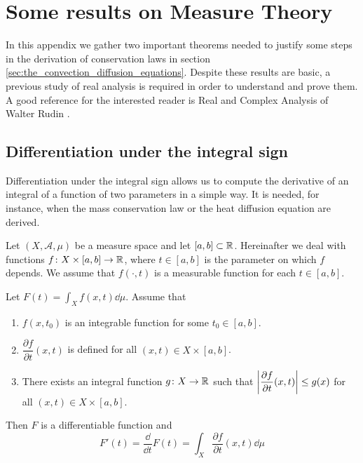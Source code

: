
\section{Some results on Measure Theory} \label{ap:measure_theory}

In this appendix we gather two important theorems needed to justify some steps
in the derivation of conservation laws in section
\ref{sec:the_convection_diffusion_equations}. Despite these results are basic, a
previous study of real analysis is required in order to understand and prove
them. A good reference for the interested reader is Real and Complex Analysis of
Walter Rudin \cite{rudin1987real}. 

\subsection{Differentiation under the integral sign}

Differentiation under the integral sign allows us to compute the derivative of
an integral of a function of two parameters in a simple way. It is needed, for
instance, when the mass conservation law or the heat diffusion equation are
derived. 

Let $(X, \mathcal{A}, \mu)$ be a measure space and let $[a, b] \subset \mathbb{R}$.
Hereinafter we deal with functions $f \colon X \times [a,b] \rightarrow \mathbb{R}$,
where $t \in [a, b]$ is the parameter on which $f$ depends. We assume that
$f(\cdot, t)$ is a measurable function for each $t \in [a, b]$.

\begin{theorem}
	\label{theo:differentiation_under_the_integral_sign} Let $F(t) = \int_X
	f(x,t) \dd{\mu}$. Assume that
	\begin{enumerate}[label={(\roman*)}, topsep=0pt]
		\item $f(x,t_0)$ is an integrable function for some $t_0 \in
		[a,b]$.
		\item $\dfrac{\partial f}{\partial t}(x,t)$ is defined for all
		$(x, t) \in X \times [a, b]$.
		\item There exists an integral function $g \colon X \rightarrow \mathbb{R}$
		such that $\abs{\dfrac{\partial f}{\partial t} (x,t)} \leq
		g(x)$ for all $(x, t) \in X \times [a, b]$.
	\end{enumerate}
	Then $F$ is a differentiable function and
	\[
		F'(t) = \frac{\dd}{\dd t} F(t) = \int_X \frac{\partial f}{\partial t}(x,t) \dd{\mu}
	\]
\end{theorem}

